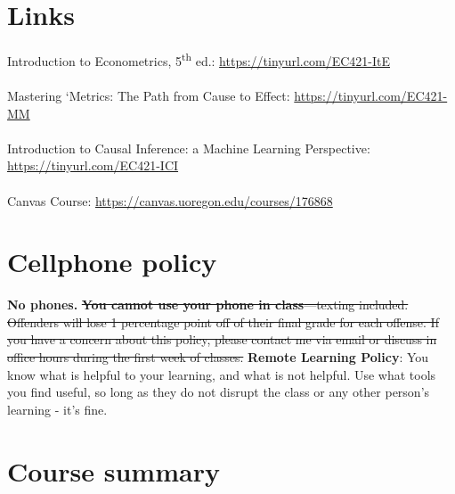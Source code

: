 \documentclass[10pt]{article}
\begin{document}
\section*{Links}

\faBook Introduction to Econometrics, 5\textsuperscript{th} ed.: \url{https://tinyurl.com/EC421-ItE} \\
\\
 \faBook Mastering `Metrics: The Path from Cause to Effect: \url{https://tinyurl.com/EC421-MM} \\
 \\
\faBook Introduction to Causal Inference: a Machine Learning Perspective: \url{https://tinyurl.com/EC421-ICI}\\
\\
\faMapMarker Canvas Course:  \url{https://canvas.uoregon.edu/courses/176868}

\bigskip

\section*{Cellphone policy}

\textbf{No phones.} \sout{\textbf{You cannot use your phone in class}---texting included. Offenders will lose 1 percentage point off of their final grade for each offense. If you have a concern about this policy, please contact me via email or discuss in office hours during the first week of classes.} \textbf{Remote Learning Policy}: You know what is helpful to your learning, and what is not helpful. Use what tools you find useful, so long as they do not disrupt the class or any other person's learning - it's fine.


\section*{Course summary}
\end{document}

